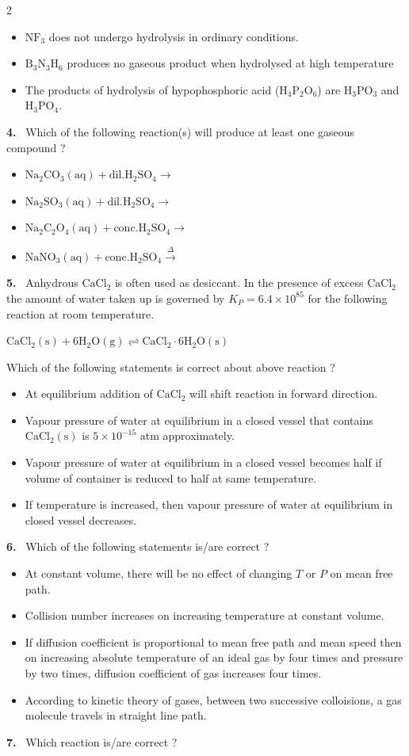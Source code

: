 \documentclass[10pt]{extarticle}
\newcommand{\qn}[1]{\par\smallskip\noindent\textbf{#1.}~}
\newenvironment{qoptions}{\begin{itemize}[leftmargin=1.8em,itemsep=1pt,topsep=2pt,label={}]}{\end{itemize}}
\newcommand{\opt}[2]{\item[(#1)] #2}
\begin{document}
\begin{multicols}{2}
\begin{qoptions}
\opt{B}{$\mathrm{NF_3}$ does not undergo hydrolysis in ordinary conditions.}
\opt{C}{$\mathrm{B_3N_3H_6}$ produces no gaseous product when hydrolysed at high temperature}
\opt{D}{The products of hydrolysis of hypophosphoric acid ($\mathrm{H_4P_2O_6}$) are $\mathrm{H_3PO_3}$ and $\mathrm{H_3PO_4}$.}
\end{qoptions}
\qn{4} Which of the following reaction(s) will produce at least one gaseous compound ?
\begin{qoptions}
\opt{A}{$\mathrm{Na_2CO_3(aq)+dil.H_2SO_4}\longrightarrow$}
\opt{B}{$\mathrm{Na_2SO_3(aq)+dil.H_2SO_4}\longrightarrow$}
\opt{C}{$\mathrm{Na_2C_2O_4(aq)+conc.H_2SO_4}\longrightarrow$}
\opt{D}{$\mathrm{NaNO_3(aq)+conc.H_2SO_4}\xrightarrow{\Delta}$}
\end{qoptions}
\qn{5} Anhydrous $\mathrm{CaCl_2}$ is often used as desiccant. In the presence of excess $\mathrm{CaCl_2}$ the amount of water taken up is governed by $K_P=6.4\times10^{85}$ for the following reaction at room temperature.\par
$\mathrm{CaCl_2(s)+6H_2O(g)\rightleftharpoons CaCl_2{\cdot}6H_2O(s)}$\par
Which of the following statements is correct about above reaction ?
\begin{qoptions}
\opt{A}{At equilibrium addition of $\mathrm{CaCl_2}$ will shift reaction in forward direction.}
\opt{B}{Vapour pressure of water at equilibrium in a closed vessel that contains $\mathrm{CaCl_2(s)}$ is $5\times10^{-15}$ atm approximately.}
\opt{C}{Vapour pressure of water at equilibrium in a closed vessel becomes half if volume of container is reduced to half at same temperature.}
\opt{D}{If temperature is increased, then vapour pressure of water at equilibrium in closed vessel decreases.}
\end{qoptions}
\qn{6} Which of the following statements is/are correct ?
\begin{qoptions}
\opt{A}{At constant volume, there will be no effect of changing $T$ or $P$ on mean free path.}
\opt{B}{Collision number increases on increasing temperature at constant volume.}
\opt{C}{If diffusion coefficient is proportional to mean free path and mean speed then on increasing absolute temperature of an ideal gas by four times and pressure by two times, diffusion coefficient of gas increases four times.}
\opt{D}{According to kinetic theory of gases, between two successive colloisions, a gas molecule travels in straight line path.}
\end{qoptions}
\qn{7} Which reaction is/are correct ?

\end{multicols}
\end{document}
